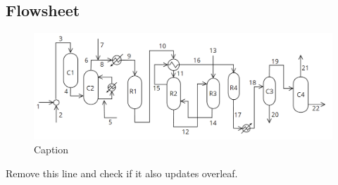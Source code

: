 \subsection{Flowsheet}
\begin{figure}[ht!]
    \centering
    \includegraphics[width = \textwidth]{Figure/FinalFlowsheet.PNG}
    \caption{Caption}
    \label{fig:my_label}
\end{figure}

Remove this line and check if it also updates overleaf.